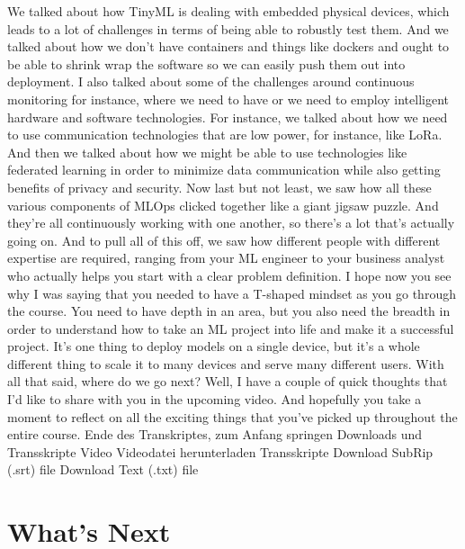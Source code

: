 {{{{{{{{    We talked about how TinyML is dealing with embedded physical devices, which
    leads to a lot of challenges in terms of being able to robustly test them.
    And we talked about how we don't have containers and things like dockers
    and ought to be able to shrink wrap the software so we can easily push them out
    into deployment.
    I also talked about some of the challenges
    around continuous monitoring for instance, where we need to have
    or we need to employ intelligent hardware and software technologies.
    For instance, we talked about how we need
    to use communication technologies that are low power, for instance, like LoRa.
    And then we talked about how we might be able to use technologies
    like federated learning in order to minimize data communication while also
    getting benefits of privacy and security.
    Now last but not least, we saw how all these various components of MLOps
    clicked together like a giant jigsaw puzzle.
    And they're all continuously working with one another,
    so there's a lot that's actually going on.
    And to pull all of this off, we saw how different people
    with different expertise are required, ranging from your ML engineer
    to your business analyst who actually helps you start with a clear problem
    definition.
    I hope now you see why I was saying that you
    needed to have a T-shaped mindset as you go through the course.
    You need to have depth in an area, but you also need the breadth
    in order to understand how to take an ML project into life
    and make it a successful project.
    It's one thing to deploy models on a single device,
    but it's a whole different thing to scale it to many devices
    and serve many different users.
    With all that said, where do we go next?
    Well, I have a couple of quick thoughts that I'd
    like to share with you in the upcoming video.
    And hopefully you take a moment to reflect on all the exciting things
    that you've picked up throughout the entire course.
    Ende des Transkriptes, zum Anfang springen
    Downloads und Transskripte
    Video
    Videodatei herunterladen
    Transskripte
    Download SubRip (.srt) file
    Download Text (.txt) file

\section{What's Next}

}}}}}}}}
